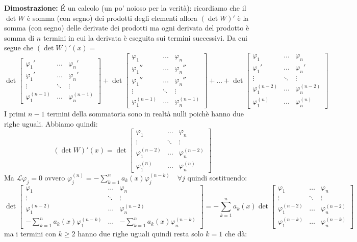 \documentclass[a4paper,11pt,titlepage]{book}
\begin{document}
\textbf{Dimostrazione: }É un calcolo (un po' noioso per la verità): ricordiamo che il $\det W$ è somma (con segno) dei prodotti degli elementi allora $(\det W)'$ è la somma (con segno) delle derivate dei prodotti ma ogni derivata del prodotto è somma di $n$ termini in cui la derivata è eseguita sui termini successivi. Da cui segue che $(\det W)'(x)=$
$$\det\begin{bmatrix}
\varphi_1' & \ldots & \varphi_n'  \\
\varphi_1' & \ldots & \varphi_n'\\
\vdots & \ddots & \vdots \\
\varphi_1^{(n-1)} & \ldots & \varphi_n^{(n-1)}
\end{bmatrix} + \det\begin{bmatrix}
\varphi_1 & \ldots & \varphi_n  \\
\varphi_1'' & \ldots & \varphi_n''\\
\varphi_1'' & \ldots & \varphi_n''\\
\vdots & \ddots & \vdots \\
\varphi_1^{(n-1)} & \ldots & \varphi_n^{(n-1)}
\end{bmatrix}+\ldots+\det\begin{bmatrix}
\varphi_1 & \ldots & \varphi_n  \\
\varphi_1' & \ldots & \varphi_n'\\
\vdots & \ddots & \vdots \\
\varphi_1^{(n-2)} & \ldots & \varphi_n^{(n-2)}\\
\varphi_1^{(n)} & \ldots & \varphi_n^{(n)}\end{bmatrix}$$I primi $n-1$ termini della sommatoria sono in realtà nulli poichè hanno due righe uguali. Abbiamo quindi:
$$(\det W)'(x)=\det\begin{bmatrix}
\varphi_1 & \ldots & \varphi_n  \\
\vdots & \ddots & \vdots \\
\varphi_1^{(n-2)} & \ldots & \varphi_n^{(n-2)}\\
\varphi_1^{(n)} & \ldots & \varphi_n^{(n)}\end{bmatrix}$$ Ma $\mathcal{L}\varphi_j=0$ ovvero $\varphi^{(n)}_j=-\sum^n_{k=1}a_k(x)\varphi_j^{(n-k)}\quad\forall j$ quindi sostituendo:
$$\det\begin{bmatrix}
\varphi_1 & \ldots & \varphi_n  \\
\vdots & \ddots & \vdots \\
\varphi_1^{(n-2)} & \ldots & \varphi_n^{(n-2)}\\
-\sum^n_{k=1}a_k(x)\varphi_1^{(n-k)} & \ldots & -\sum^n_{k=1}a_k(x)\varphi_n^{(n-k)}\end{bmatrix}=-\sum^n_{k=1}a_k(x)\det\begin{bmatrix}
\varphi_1 & \ldots & \varphi_n  \\
\vdots & \ddots & \vdots \\
\varphi_1^{(n-2)} & \ldots & \varphi_n^{(n-2)}\\
\varphi_1^{(n-k)} & \ldots & \varphi_n^{(n-k)}\end{bmatrix}$$ ma i termini con $k\geq2$ hanno due righe uguali quindi resta solo $k=1$ che dà:
\end{document}
